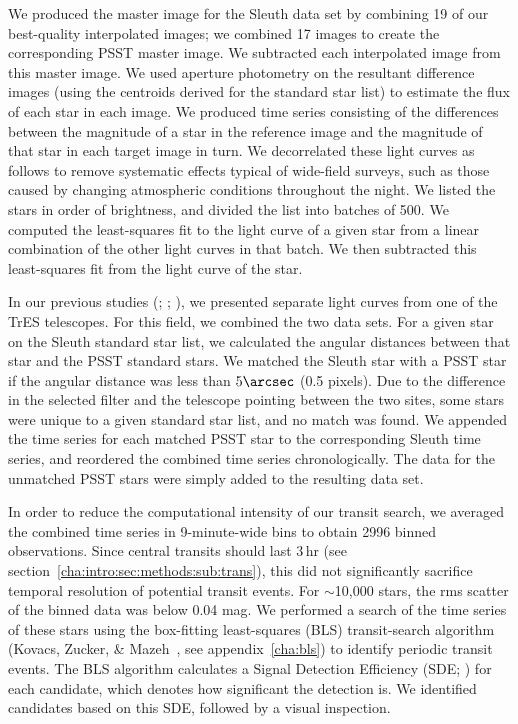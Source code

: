 We produced the master image for the Sleuth data set by combining 19
of our best-quality interpolated images; we combined 17 images to
create the corresponding PSST master image. We subtracted each
interpolated image from this master image. We used aperture photometry
on the resultant difference images (using the centroids derived for
the standard star list) to estimate the flux of each star in each
image. We produced time series consisting of the differences between
the magnitude of a star in the reference image and the magnitude of
that star in each target image in turn. We decorrelated these light
curves as follows to remove systematic effects typical of wide-field
surveys, such as those caused by changing atmospheric conditions
throughout the night. We listed the stars in order of brightness, and
divided the list into batches of 500. We computed the least-squares
fit to the light curve of a given star from a linear combination of
the other light curves in that batch. We then subtracted this
least-squares fit from the light curve of the star.

In our previous studies
(\citealp{Alonso_Brown_Torres:apjl:2004a}; \citealp{Mandushev_Torres_Latham:apj:2005a}; \citealp{Creevey_Benedict_Brown:apjl:2005a}),
we presented separate light curves from one of the TrES telescopes.
For this field, we combined the two data sets. For a given star on the
Sleuth standard star list, we calculated the angular distances between
that star and the PSST standard stars. We matched the Sleuth star with
a PSST star if the angular distance was less than $5\arcsec$ (0.5
pixels). Due to the difference in the selected filter and the
telescope pointing between the two sites, some stars were unique to a
given standard star list, and no match was found. We appended the time
series for each matched PSST star to the corresponding Sleuth time
series, and reordered the combined time series chronologically. The
data for the unmatched PSST stars were simply added to the resulting
data set.

In order to reduce the computational intensity of our transit search,
we averaged the combined time series in 9-minute-wide bins to obtain
2996 binned observations. Since central transits should last 3\,hr (see section~\ref{cha:intro:sec:methods:sub:trans}),
this did not significantly sacrifice temporal resolution of potential
transit events. For $\sim$10,000 stars, the rms scatter of the binned
data was below 0.04 mag. We performed a search of the time series of
these stars using the box-fitting least-squares (BLS) transit-search
algorithm (Kovacs, Zucker, \& Mazeh~\citeyear{Kovacs_Zucker_Mazeh:aa:2002a}, see appendix~\ref{cha:bls}) to identify periodic transit events. The BLS algorithm calculates a Signal
Detection Efficiency (SDE;
\citealp[see][]{Kovacs_Zucker_Mazeh:aa:2002a}) for each candidate,
which denotes how significant the detection is. We identified
candidates based on this SDE, followed by a visual inspection.

